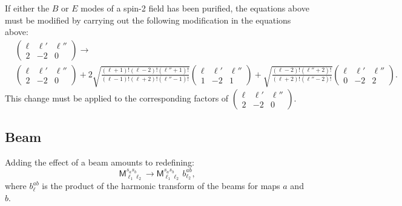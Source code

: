 \documentclass[a4paper,10pt]{article}
\newcommand{\wtj}[6]{\left(\begin{array}{ccc} #1 & #2 & #3\\#4 & #5 & #6\end{array} \right)}
\begin{document}
    If either the $B$ or $E$ modes of a spin-2 field has been purified, the equations above must be modified by carrying out the following modification in the equations above:
    \begin{align}
      &\wtj{\ell}{\ell'}{\ell''}{2}{-2}{0}\longrightarrow\\\nonumber
      &\wtj{\ell}{\ell'}{\ell''}{2}{-2}{0}+2\sqrt{\frac{(\ell+1)!(\ell-2)!(\ell''+1)!}{(\ell-1)!(\ell+2)!(\ell''-1)!}}\wtj{\ell}{\ell'}{\ell''}{1}{-2}{1}+\sqrt{\frac{(\ell-2)!(\ell''+2)!}{(\ell+2)!(\ell''-2)!}}\wtj{\ell}{\ell'}{\ell''}{0}{-2}{2}.
    \end{align}
    This change must be applied to the corresponding factors of $\wtj{\ell}{\ell'}{\ell''}{2}{-2}{0}$.


\subsection{Beam}
  Adding the effect of a beam amounts to redefining:
  \begin{equation}
    \mathsf{M}^{s_as_b}_{\ell_1\ell_2}\rightarrow\mathsf{M}^{s_as_b}_{\ell_1\ell_2}\,b^{ab}_{\ell_2},
  \end{equation}
  where $b^{ab}_\ell$ is the product of the harmonic transform of the beams for maps $a$ and $b$.
    
\end{document}
